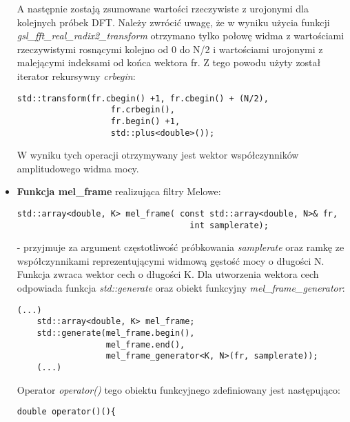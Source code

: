 \begin{itemize}
A następnie zostają zsumowane wartości rzeczywiste z urojonymi dla kolejnych próbek DFT. Należy zwrócić uwagę, że w wyniku użycia funkcji \textit{gsl\_fft\_real\_radix2\_transform} otrzymano tylko połowę widma z wartościami rzeczywistymi rosnącymi kolejno od 0 do N/2 i wartościami urojonymi z malejącymi indeksami od końca wektora fr. Z tego powodu użyty został iterator rekursywny \textit{crbegin}:

\begin{lstlisting}[style=lst:cpp]
    std::transform(fr.cbegin() +1, fr.cbegin() + (N/2),
                   fr.crbegin(),
                   fr.begin() +1,
                   std::plus<double>());
\end{lstlisting}
W wyniku tych operacji otrzymywany jest wektor współczynników amplitudowego widma mocy.

\item{\textbf{Funkcja mel\_frame} realizująca filtry Melowe:
 \begin{lstlisting}[style=lst:cpp]
  std::array<double, K> mel_frame( const std::array<double, N>& fr,
                                   int samplerate);
\end{lstlisting}
}
- przyjmuje za argument częstotliwość próbkowania \textit{samplerate} oraz ramkę ze współczynnikami reprezentującymi widmową gęstość mocy o długości N. Funkcja zwraca wektor cech o długości K. Dla utworzenia wektora cech odpowiada funkcja \textit{std::generate} oraz obiekt funkcyjny \textit{mel\_frame\_generator}:

 \begin{lstlisting}[style=lst:cpp]
    (...)
    std::array<double, K> mel_frame;
    std::generate(mel_frame.begin(),
                  mel_frame.end(),
                  mel_frame_generator<K, N>(fr, samplerate));
    (...)
 \end{lstlisting}

Operator \textit{operator()} tego obiektu funkcyjnego zdefiniowany jest następująco:

 \begin{lstlisting}[style=lst:cpp]
    double operator()(){
 \end{lstlisting}


\end{itemize}
